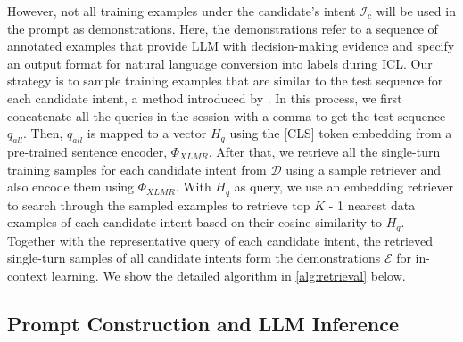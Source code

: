 However, not all training examples under the candidate's intent $\mathcal{I}_{c}$ will be used in the prompt as demonstrations. Here, the demonstrations refer to a sequence of annotated examples that provide LLM with decision-making evidence and specify an output format for natural language conversion into labels during ICL. Our strategy is to sample training examples that are similar to the test sequence for each candidate intent, a method introduced by \cite{liu2021makes}. In this process, we first concatenate all the queries in the session with a comma to get the test sequence $q_{all}$. Then, $q_{all}$ is mapped to a vector $H_{q}$ using the [CLS] token embedding from a pre-trained sentence encoder, $\Phi_{XLMR}$. After that, we retrieve all the single-turn training samples for each candidate intent from $\mathcal{D}$ using a sample retriever and also encode them using $\Phi_{XLMR}$. With $H_{q}$ as query, we use an embedding retriever to search through the sampled examples to retrieve top $K$ - 1 nearest data examples of each candidate intent based on their cosine similarity to $H_{q}$. Together with the representative query of each candidate intent, the retrieved single-turn samples of all candidate intents form the demonstrations $\mathcal{E}$ for in-context learning. We show the detailed algorithm in \ref{alg:retrieval} below.



\subsection{Prompt Construction and LLM Inference}

